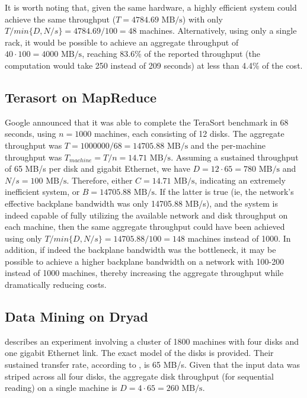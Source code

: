 \documentclass{acm_proc_article-sp}
\begin{document}
It is worth noting that, given the same hardware, a highly efficient system could achieve the same throughput ($T = 4784.69 \text{ MB/s}$) with only $T / min\{D, N/s\} = 4784.69 / 100 = 48$ machines. Alternatively, using only a single rack, it would be possible to achieve an aggregate throughput of $40 \cdot 100 = 4000 \text{ MB/s}$, reaching 83.6\% of the reported throughput (the computation would take 250 instead of 209 seconds) at less than 4.4\% of the cost.

\subsection{Terasort on MapReduce}
Google announced \cite{mapreduceterasort} that it was able to complete the TeraSort benchmark in 68 seconds, using $n=1000$ machines, each consisting of 12 disks. The aggregate throughput was $T = 1000000/68 = 14705.88 \text{ MB/s}$ and the per-machine throughput was $T_{machine} = T / n = 14.71 \text{ MB/s}$. Assuming a sustained throughput of 65 MB/s per disk and gigabit Ethernet, we have $D = 12 \cdot 65 = 780 \text{ MB/s}$ and $N/s = 100 \text{ MB/s}$. Therefore, either $C = 14.71 \text{ MB/s}$, indicating an extremely inefficient system, or $B = 14705.88 \text{ MB/s}$. If the latter is true (ie, the network's effective backplane bandwidth was only 14705.88 MB/s), and the system is indeed capable of fully utilizing the available network and disk throughput on each machine, then the same aggregate throughput could have been achieved using only $T / min\{D, N/s\} = 14705.88 / 100 = 148$ machines instead of 1000. In addition, if indeed the backplane bandwidth was the bottleneck, it may be possible to achieve a higher backplane bandwidth on a network with 100-200 instead of 1000 machines, thereby increasing the aggregate throughput while dramatically reducing costs.

\subsection{Data Mining on Dryad}
\cite{dryad} describes an experiment involving a cluster of 1800 machines with four disks and one gigabit Ethernet link. The exact model of the disks is provided. Their sustained transfer rate, according to \cite{wd400gb}, is 65 MB/s. Given that the input data was striped across all four disks, the aggregate disk throughput (for sequential reading) on a single machine is $D = 4 \cdot 65 = 260 \text{ MB/s}$.
\end{document}
